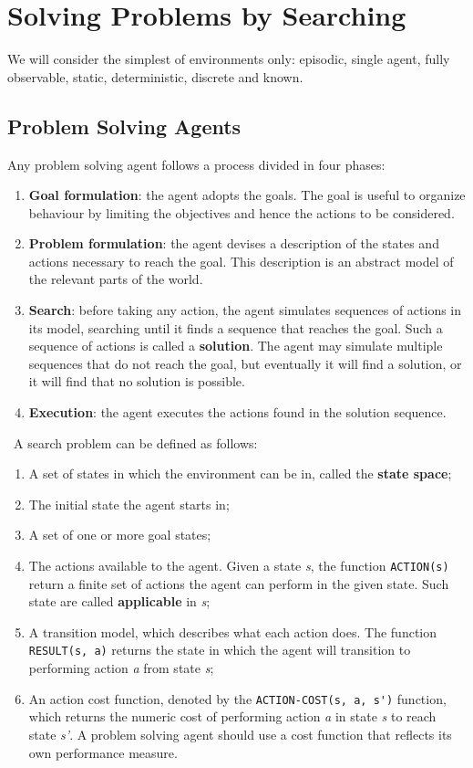 \documentclass{article}
\begin{document}
\newpage
\section{Solving Problems by Searching}
We will consider the simplest of environments only: episodic, single agent, fully observable, static, deterministic, discrete and known.

\subsection{Problem Solving Agents}
Any problem solving agent follows a process divided in four phases:
\begin{enumerate}
    \item \textbf{Goal formulation}: the agent adopts the goals. The goal is useful to organize behaviour by limiting the objectives and hence the actions to be considered.
    \item \textbf{Problem formulation}: the agent devises a description of the states and actions necessary to reach the goal. This description is an abstract model of the relevant parts of the world.
    \item \textbf{Search}: before taking any action, the agent simulates sequences of actions in its model, searching until it finds a sequence that reaches the goal. Such a sequence of actions is called a \textbf{solution}. The agent may simulate multiple sequences that do not reach the goal, but eventually it will find a solution, or it will find that no solution is possible.
    \item \textbf{Execution}: the agent executes the actions found in the solution sequence.
\end{enumerate}
\
A search problem can be defined as follows:
\begin{enumerate}
    \item A set of states in which the environment can be in, called the \textbf{state space};
    \item The initial state the agent starts in;
    \item A set of one or more goal states;
    \item The actions available to the agent. Given a state \textit{s}, the function \lstinline{ACTION(s)} return a finite set of actions the agent can perform in the given state. Such state are called \textbf{applicable} in \textit{s};
    \item A transition model, which describes what each action does. The function \lstinline{RESULT(s, a)} returns the state in which the agent will transition to performing action \textit{a} from state \textit{s};
    \item An action cost function, denoted by the \lstinline{ACTION-COST(s, a, s')} function, which returns the numeric cost of performing action \textit{a} in state \textit{s} to reach state \textit{s'}. A problem solving agent should use a cost function that reflects its own performance measure.
\end{enumerate}
\end{document}
